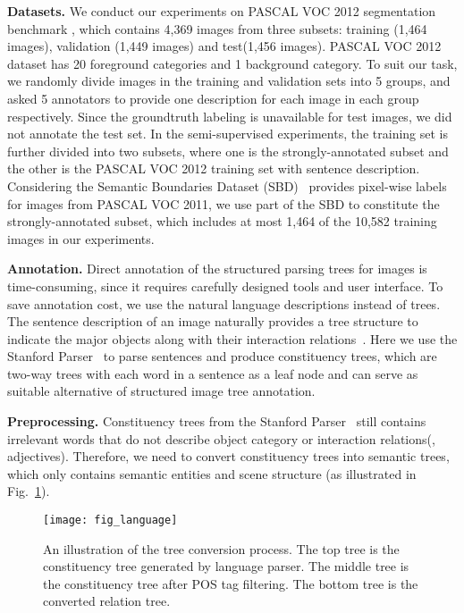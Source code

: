 \documentclass[10pt,twocolumn,letterpaper]{article}
\begin{document}
\textbf{Datasets.}
We conduct our experiments on PASCAL VOC 2012 segmentation benchmark \cite{pascal_voc}, which contains 4,369 images from three subsets: training (1,464 images), validation (1,449 images) and test(1,456 images). PASCAL VOC 2012 dataset has 20 foreground categories and 1 background category. To suit our task, we randomly divide images in the training and validation sets into 5 groups, and asked 5 annotators to provide one description for each image in each group respectively. Since the groundtruth labeling is unavailable for test images, we did not annotate the test set. In the semi-supervised experiments, the training set is further divided into two subsets, where one is the strongly-annotated subset and the other is the PASCAL VOC 2012 training set with sentence description. Considering the Semantic Boundaries Dataset (SBD)~\cite{sbd_dataset} provides pixel-wise labels for images from PASCAL VOC 2011, we use part of the SBD to constitute the strongly-annotated subset, which includes at most 1,464 of the 10,582 training images in our experiments.

\textbf{Annotation.}
Direct annotation of the structured parsing trees for images is time-consuming, since it requires carefully designed tools and user interface. To save annotation cost, we use the natural language descriptions instead of trees. The sentence description of an image naturally provides a tree structure to indicate the major objects along with their interaction relations~\cite{DBLP:journals/ml/Elman91}. Here we use the Stanford Parser~\cite{DBLP:conf/acl/SocherBMN13} to parse sentences and produce constituency trees, which are two-way trees with each word in a sentence as a leaf node and can serve as suitable alternative of structured image tree annotation.

\textbf{Preprocessing.}
Constituency trees from the Stanford Parser~\cite{DBLP:conf/acl/SocherBMN13} still contains irrelevant words that do not describe object category or interaction relations(\eg, adjectives). Therefore, we need to convert constituency trees into semantic trees, which only contains semantic entities and scene structure (as illustrated in Fig.~\ref{fig:language}).

\begin{figure}[t]
\centering
\texttt{[image: fig\_language]}
\caption{An illustration of the tree conversion process. The top tree is the constituency tree generated by language parser. The middle tree is the constituency tree after POS tag filtering. The bottom tree is the converted relation tree.}
\label{fig:language}
\end{figure}
\end{document}

